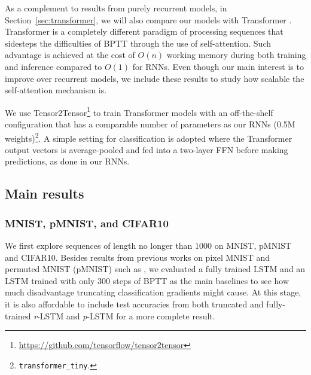 \documentclass{article}
\newcommand{\rlstm}{{\it r}-LSTM}
\newcommand{\plstm}{{\it p}-LSTM}
\begin{document}
As a complement to results from purely recurrent models, in Section~\ref{sec:transformer}, we will also compare our models with Transformer \cite{vaswani2017attention}. Transformer is a completely different paradigm of processing sequences that sidesteps the difficulties of BPTT through the use of self-attention. Such advantage is achieved at the cost of $O(n)$ working memory during both training and inference compared to $O(1)$ for RNNs. Even though our main interest is to improve over recurrent models, we include these results to study how scalable the self-attention mechanism is. 

We use Tensor2Tensor\footnote{\url{https://github.com/tensorflow/tensor2tensor}} to train Transformer models with an off-the-shelf configuration that has a comparable number of parameters as our RNNs (0.5M weights)\footnote{\texttt{transformer\_tiny}.}. A simple setting for classification is adopted where the Transformer output vectors is average-pooled and fed into a two-layer FFN before making predictions, as done in our RNNs.


\subsection{Main results}

\subsubsection{MNIST, pMNIST, and CIFAR10}
We first explore sequences of length no longer than 1000 on MNIST, pMNIST and CIFAR10. Besides results from previous works on pixel MNIST and permuted MNIST (pMNIST) such as \citet{le2015simple,arjovsky2016unitary}, we evaluated a fully trained LSTM and an LSTM trained with only 300 steps of BPTT as the main baselines to see how much disadvantage truncating classification gradients might cause. At this stage, it is also affordable to include test accuracies from both truncated and fully-trained \rlstm{} and \plstm{} for a more complete result.
\end{document}
